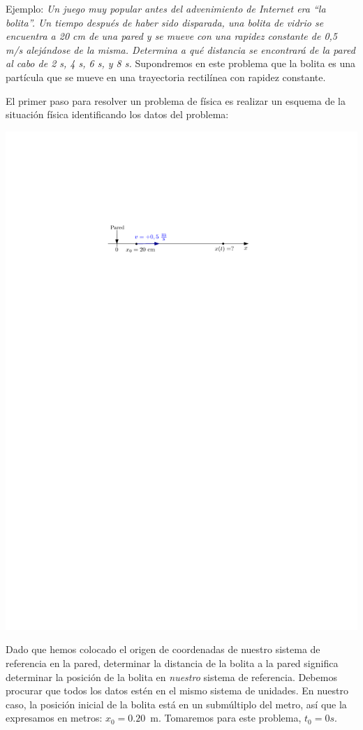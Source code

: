 \begin{example}{Ejemplo:}
  {\it Un juego muy popular antes del advenimiento de Internet era ``la bolita''. Un tiempo después de haber sido disparada, una bolita de vidrio se encuentra a 20 cm de una pared y se mueve con una rapidez constante de 0,5 m/s alejándose de la misma. Determina a qué distancia se encontrará de la pared al cabo de 2 s, 4 s, 6 s, y 8 s.}
  \tcblower
  { Supondremos en este problema que la bolita es una partícula que se mueve en una trayectoria rectilínea con rapidez constante.}
  
El primer paso para resolver un problema de física es realizar un esquema de la situación física identificando los datos del problema:
  \begin{center}
    \includegraphics[]{img/bolita.pdf}
  \end{center}
  Dado que hemos colocado el origen de coordenadas de nuestro sistema de referencia en la pared, determinar la distancia de la bolita a la pared significa determinar la posición de la bolita en {\em nuestro} sistema de referencia.
  Debemos procurar que todos los datos estén en el mismo sistema de unidades. En nuestro caso, la posición inicial de la bolita está en un submúltiplo del metro, así que la expresamos en metros: $x_0=0.20$~m. Tomaremos para este problema, $t_0=0\si{s}$.


\end{example}
